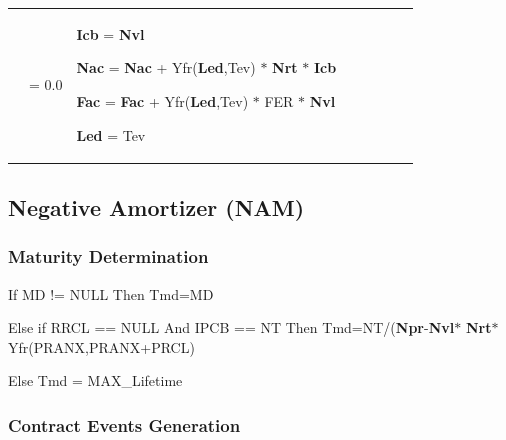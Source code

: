 \documentclass[9pt,oneside]{amsart}
\begin{document}
{\begin{longtable}{p{0.48in}p{2.8in}p{-0.45in}p{0.26in}p{0.12in}p{0.37in}p{0.06in}p{0.09in}}
\hhline{---}
\multicolumn{1}{|p{0.48in}}{IPCB} & 
\multicolumn{1}{|p{2.8in}}{= 0.0} & 
\multicolumn{1}{|p{-0.45in}}{\textbf{Icb }= \textbf{Nvl} \par \textbf{Nac }= \textbf{Nac }+ Yfr(\textbf{Led},Tev) $\ast$  \textbf{Nrt }$\ast$  \textbf{Icb} \par \textbf{Fac }= \textbf{Fac} + Yfr(\textbf{Led},Tev) $\ast$  FER\textbf{ }$\ast$  \textbf{Nvl} \par \textbf{Led }= Tev} & 

\hhline{---}

\end{longtable}}



\vspace{\baselineskip}
\subsection{Negative Amortizer (NAM)}
\subsubsection{Maturity Determination}
If MD != NULL Then Tmd=MD

Else if RRCL == NULL And IPCB == NT Then Tmd=NT/(\textbf{Npr}-\textbf{Nvl}$\ast$ \textbf{Nrt}$\ast$  Yfr(PRANX,PRANX+PRCL)\par

Else Tmd = MAX\_Lifetime

\subsubsection{Contract Events Generation}


\end{document}

